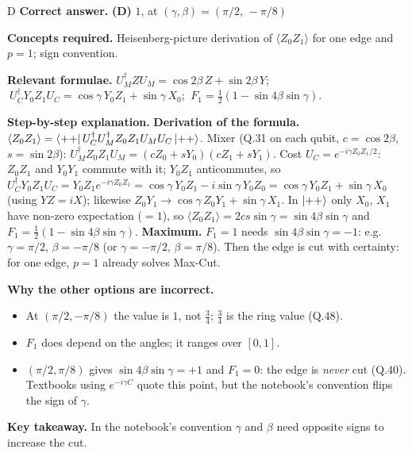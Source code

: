 \documentclass[11pt,a4paper]{article}
\newcommand{\qsep}{\par\vspace{2pt}{\color{black!15}\hrule}\vspace{4pt}}
\begin{document}
\begin{solbox}{D}
\textbf{\color{brand}Correct answer.} \textcolor{okgreen}{\textbf{(D)}} $1$, at $(\gamma, \beta) = (\pi/2,\, -\pi/8)$

\textbf{\color{brand}Concepts required.} Heisenberg-picture derivation of $\langle Z_0Z_1\rangle$ for one edge and $p = 1$; sign convention.

\textbf{\color{brand}Relevant formulae.} $U_M^\dagger Z U_M = \cos2\beta\,Z + \sin2\beta\,Y$; $\ U_C^\dagger Y_0Z_1U_C = \cos\gamma\,Y_0Z_1 + \sin\gamma\,X_0$; $\ F_1 = \tfrac12(1 - \sin4\beta\sin\gamma)$.

\textbf{\color{brand}Step-by-step explanation.} \textbf{Derivation of the formula.} $\langle Z_0Z_1\rangle = \bra{+ +}U_C^\dagger U_M^\dagger Z_0Z_1 U_MU_C\ket{+ +}$.
Mixer (Q.31 on each qubit, $c = \cos2\beta$, $s = \sin2\beta$): $U_M^\dagger Z_0Z_1U_M = (cZ_0 + sY_0)(cZ_1 + sY_1)$.
Cost $U_C = e^{-i\gamma Z_0Z_1/2}$: $Z_0Z_1$ and $Y_0Y_1$ commute with it; $Y_0Z_1$ anticommutes, so
$U_C^\dagger Y_0Z_1U_C = Y_0Z_1e^{-i\gamma Z_0Z_1} = \cos\gamma\,Y_0Z_1 - i\sin\gamma\,Y_0Z_0 = \cos\gamma\,Y_0Z_1 + \sin\gamma\,X_0$
(using $YZ = iX$); likewise $Z_0Y_1 \to \cos\gamma\,Z_0Y_1 + \sin\gamma\,X_1$. In $\ket{++}$ only $X_0$, $X_1$ have non-zero
expectation ($=1$), so $\langle Z_0Z_1\rangle = 2cs\sin\gamma = \sin4\beta\sin\gamma$ and $F_1 = \tfrac12(1 - \sin4\beta\sin\gamma)$.
\textbf{Maximum.} $F_1 = 1$ needs $\sin4\beta\sin\gamma = -1$: e.g.\ $\gamma = \pi/2$, $\beta = -\pi/8$ (or $\gamma = -\pi/2$, $\beta = \pi/8$).
Then the edge is cut with certainty: for one edge, $p = 1$ already solves Max-Cut.

\textbf{\color{brand}Why the other options are incorrect.}
\begin{itemize}[leftmargin=2.4em, itemsep=1pt, topsep=2pt]
\item[\textbf{(A)}] At $(\pi/2, -\pi/8)$ the value is $1$, not $\frac34$; $\frac34$ is the ring value (Q.48).
\item[\textbf{(B)}] $F_1$ does depend on the angles; it ranges over $[0, 1]$.
\item[\textbf{(C)}] $(\pi/2, \pi/8)$ gives $\sin4\beta\sin\gamma = +1$ and $F_1 = 0$: the edge is \emph{never} cut (Q.40). Textbooks using $e^{-i\gamma C}$ quote this point, but the notebook's convention flips the sign of $\gamma$.
\end{itemize}
\textbf{\color{brand}Key takeaway.} In the notebook's convention $\gamma$ and $\beta$ need opposite signs to increase the cut.
\end{solbox}
\qsep
\end{document}
